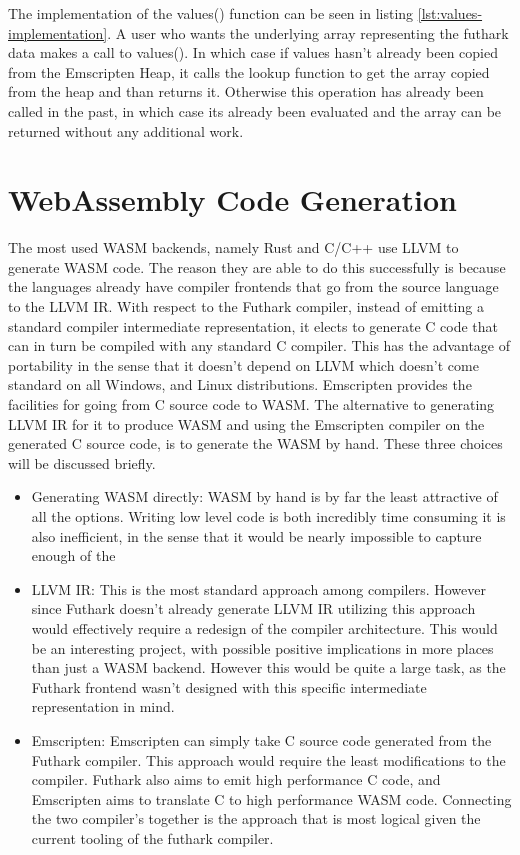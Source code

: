 \documentclass[11pt]{book}
\begin{document}
The implementation of the values() function can be seen in listing \ref{lst:values-implementation}. A user who wants the underlying array representing the futhark data makes a call to values(). In which case if values hasn't already been copied from the Emscripten Heap, it calls the lookup function to get the array copied from the heap and than returns it. Otherwise this operation has already been called in the past, in which case its already been evaluated and the array can be returned without any additional work. 


\section{WebAssembly Code Generation}

The most used WASM backends, namely Rust and C/C++ use LLVM to generate WASM code. The reason they are able to do this successfully is because the languages already have compiler frontends that go from the source language to the LLVM IR. With respect to the Futhark compiler, instead of emitting a standard compiler intermediate representation, it elects to generate C code that can in turn be compiled with any standard C compiler. This has the advantage of portability in the sense that it doesn't depend on LLVM which doesn't come standard on all Windows, and Linux distributions. Emscripten provides the facilities for going from C source code to WASM. The alternative to generating LLVM IR for it to produce WASM and using the Emscripten compiler on the generated C source code, is to generate the WASM by hand. These three choices will be discussed briefly.

\begin{itemize}
    \item Generating WASM directly: 
        WASM by hand is by far the least attractive of all the options. Writing low level code is both incredibly time consuming it is also inefficient, in the sense that it would be nearly impossible to capture enough of the  
    \item LLVM IR: This is the most standard approach among compilers. However since Futhark doesn't already generate LLVM IR utilizing this approach would effectively require a redesign of the compiler architecture. This would be an interesting project, with possible positive implications in more places than just a WASM backend. However this would be quite a large task, as the Futhark frontend wasn't designed with this specific intermediate representation in mind. 
    \item Emscripten: Emscripten can simply take C source code generated from the Futhark compiler. This approach would require the least modifications to the compiler. Futhark also aims to emit high performance C code, and Emscripten aims to translate C to high performance WASM code. Connecting the two compiler's together is the approach that is most logical given the current tooling of the futhark compiler.
\end{itemize}
\end{document}
